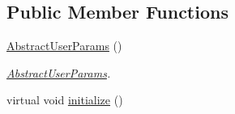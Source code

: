 \subsection*{Public Member Functions}
\begin{DoxyCompactItemize}
\item 
\hypertarget{class_a_p_i2_1_1_abstract_user_params_aa480ae3650fb0b0ac32a104e2f6b9344}{\hyperlink{class_a_p_i2_1_1_abstract_user_params_aa480ae3650fb0b0ac32a104e2f6b9344}{Abstract\-User\-Params} ()}\label{class_a_p_i2_1_1_abstract_user_params_aa480ae3650fb0b0ac32a104e2f6b9344}

\begin{DoxyCompactList}\small\item\em \hyperlink{class_a_p_i2_1_1_abstract_user_params}{Abstract\-User\-Params}. \end{DoxyCompactList}\item 
\hypertarget{class_a_p_i2_1_1_abstract_user_params_a41520a822ed1a52b95709b826bc1be38}{virtual void \hyperlink{class_a_p_i2_1_1_abstract_user_params_a41520a822ed1a52b95709b826bc1be38}{initialize} ()}\label{class_a_p_i2_1_1_abstract_user_params_a41520a822ed1a52b95709b826bc1be38}


\end{DoxyCompactItemize}
